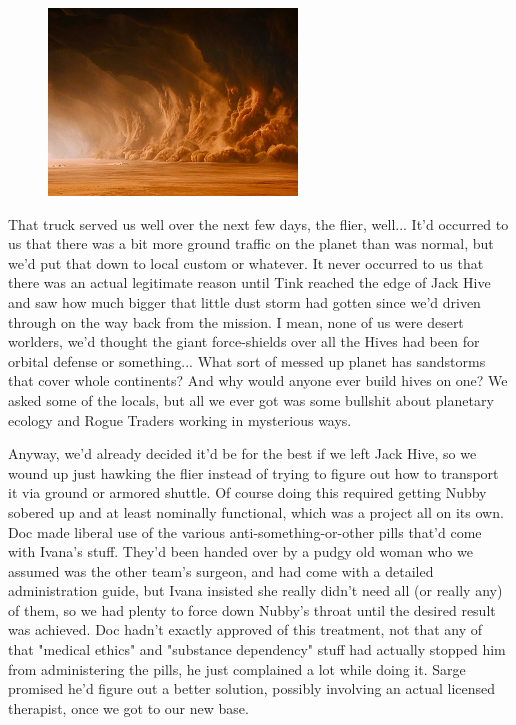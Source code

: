 \begin{figure}
	\begin{center}
		\includegraphics[width=\figwidth]{pics/19/18.png}
	\end{center}
\end{figure}
That truck served us well over the next few days, the flier, well... 
It'd occurred to us that there was a bit more ground traffic on the planet than was normal, but we'd put that down to local custom or whatever. 
It never occurred to us that there was an actual legitimate reason until Tink reached the edge of Jack Hive and saw how much bigger that little dust storm had gotten since we'd driven through on the way back from the mission. 
I mean, none of us were desert worlders, we'd thought the giant force-shields over all the Hives had been for orbital defense or something... 
What sort of messed up planet has sandstorms that cover whole continents? 
And why would anyone ever build hives on one? 
We asked some of the locals, but all we ever got was some bullshit about planetary ecology and Rogue Traders working in mysterious ways.

Anyway, we'd already decided it'd be for the best if we left Jack Hive, so we wound up just hawking the flier instead of trying to figure out how to transport it via ground or armored shuttle. 
Of course doing this required getting Nubby sobered up and at least nominally functional, which was a project all on its own. 
Doc made liberal use of the various anti-something-or-other pills that'd come with Ivana's stuff. 
They'd been handed over by a pudgy old woman who we assumed was the other team's surgeon, and had come with a detailed administration guide, but Ivana insisted she really didn't need all (or really any) of them, so we had plenty to force down Nubby's throat until the desired result was achieved. 
Doc hadn't exactly approved of this treatment, not that any of that "medical ethics" and "substance dependency" stuff had actually stopped him from administering the pills, he just complained a lot while doing it. 
Sarge promised he'd figure out a better solution, possibly involving an actual licensed therapist, once we got to our new base.

